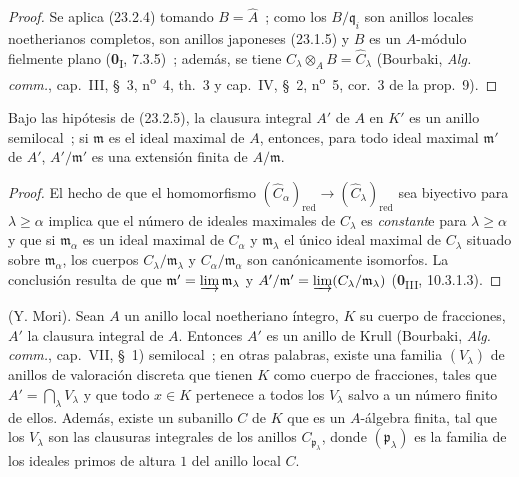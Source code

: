 
\begin{proof}
Se aplica (23.2.4) tomando $B=\widehat A$~; como los
$B/\mathfrak q_i$ son anillos locales noetherianos completos, son anillos
japoneses (23.1.5) y $B$ es un $A$-módulo fielmente plano
(\textbf{0}\textsubscript{I}, 7.3.5)~; además, se tiene
$C_\lambda\otimes_AB=\widehat C_\lambda$ (Bourbaki, \emph{Alg. comm.},
cap.~III, §~3, n\textsuperscript{o}~4, th.~3 y cap.~IV, §~2,
n\textsuperscript{o}~5, cor.~3 de la prop.~9).
\end{proof}

\begin{corollary}[23.2.6]
\label{0.23.2.6-fr}
Bajo las hipótesis de \textup{(23.2.5)}, la clausura integral $A'$ de $A$ en
$K'$ es un anillo semilocal~; si $\mathfrak m$ es el ideal maximal de $A$,
entonces, para todo ideal maximal $\mathfrak m'$ de $A'$,
$A'/\mathfrak m'$ es una extensión finita de $A/\mathfrak m$.
\end{corollary}

\begin{proof}
El hecho de que el homomorfismo
$(\widehat C_\alpha)_{\mathrm{red}}\to
(\widehat C_\lambda)_{\mathrm{red}}$ sea biyectivo para
$\lambda\geqslant\alpha$ implica que el número de ideales maximales de
$C_\lambda$ es \emph{constant}e para $\lambda\geqslant\alpha$ y que si
$\mathfrak m_\alpha$ es un ideal maximal de $C_\alpha$ y
$\mathfrak m_\lambda$ el único ideal maximal de $C_\lambda$ situado sobre
$\mathfrak m_\alpha$, los cuerpos $C_\lambda/\mathfrak m_\lambda$ y
$C_\alpha/\mathfrak m_\alpha$ son canónicamente isomorfos. La conclusión
resulta de que $\mathfrak m'=\varinjlim\mathfrak m_\lambda$ y
$A'/\mathfrak m'=\varinjlim(C_\lambda/\mathfrak m_\lambda)$
(\textbf{0}\textsubscript{III}, 10.3.1.3).
\end{proof}

\begin{proposition}[23.2.7]
\label{0.23.2.7-fr}
\textnormal{(Y. Mori).} Sean $A$ un anillo local noetheriano íntegro, $K$ su
cuerpo de fracciones, $A'$ la clausura integral de $A$. Entonces $A'$ es un
anillo de Krull \textup{(Bourbaki, \emph{Alg. comm.}, cap.~VII, §~1)} semilocal~;
en otras palabras, existe una familia $(V_\lambda)$ de anillos de valoración
discreta que tienen $K$ como cuerpo de fracciones, tales que
$A'=\bigcap_\lambda V_\lambda$ y que todo $x\in K$ pertenece a todos los
$V_\lambda$ salvo a un número finito de ellos. Además, existe un
subanillo $C$ de $K$ que es un $A$-álgebra finita, tal que los
$V_\lambda$ son las clausuras integrales de los anillos
$C_{\mathfrak p_\lambda}$, donde $(\mathfrak p_\lambda)$ es la familia de los
ideales primos de altura $1$ del anillo local $C$.
\end{proposition}

